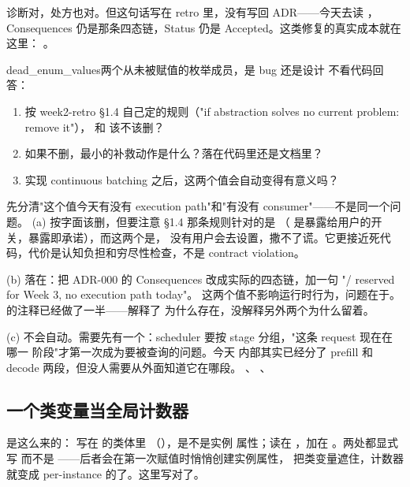 诊断对，处方也对。但这句话写在 retro 里，没有写回 ADR——今天去读 ，
Consequences 仍是那条四态链，Status 仍是 Accepted。这类修复的真实成本就在这里：
。

\begin{checkpoint}{dead_enum_values}{两个从未被赋值的枚举成员，是 bug 还是设计}
不看代码回答：
\begin{enumerate}[label=(\alph*)]
  \item 按 week2-retro §1.4 自己定的规则（"if abstraction solves no current problem: remove
        it"）， 和  该不该删？
  \item 如果不删，最小的补救动作是什么？落在代码里还是文档里？
  \item {} 实现 continuous batching 之后，这两个值会自动变得有意义吗？
\end{enumerate}
\hint 先分清"这个值今天有没有 execution path"和"有没有 consumer"——不是同一个问题。
\ifshowanswers
\tcblower
\answer (a) 按字面该删，但要注意 §1.4 那条规则针对的是 
（ 是暴露给用户的开关，暴露即承诺），而这两个是，
没有用户会去设置，撒不了谎。它更接近死代码，代价是认知负担和穷尽性检查，不是 contract violation。

(b) 落在：把 ADR-000 的 Consequences 改成实际的四态链，加一句
"/ reserved for Week 3, no execution path today"。
这两个值不影响运行时行为，问题在于。
 的注释已经做了一半——解释了
 为什么存在，没解释另外两个为什么留着。

(c) 不会自动。需要先有一个：scheduler 要按 stage 分组，"这条 request 现在在哪一
阶段"才第一次成为要被查询的问题。今天  内部其实已经分了 prefill 和
decode 两段，但没人需要从外面知道它在哪段。
\whereincode {}、
、
\fi
\end{checkpoint}

\subsection{一个类变量当全局计数器}
\label{sec:a-shape-index}

 是这么来的： 写在  的类体里
（），是不是实例
属性；读在 ，加在
。两处都显式写
 而不是 ——后者会在第一次赋值时悄悄创建实例属性，
把类变量遮住，计数器就变成 per-instance 的了。这里写对了。

